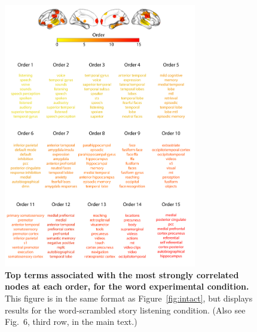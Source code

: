 \documentclass[english]{article}
\newcommand{\neurosynth}{6}
\begin{document}
\begin{figure}[p!]
\centering
\includegraphics[width=0.75\textwidth]{figs/supp_15_word}
\caption{\textbf{Top terms associated with the most strongly
      correlated nodes at each order, for the word experimental
    condition.}  This figure is in the same format as
  Figure~\ref{fig:intact}, but displays results for the
  word-scrambled story listening condition.  (Also see Fig.~\neurosynth,
third row, in the main text.)}
\label{fig:word}
\end{figure}
\end{document}
